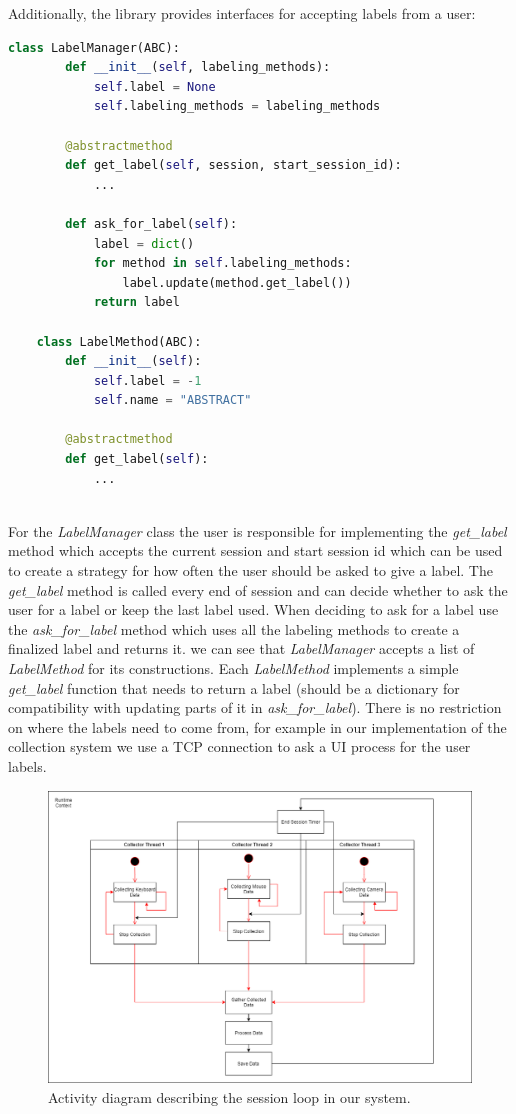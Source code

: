 \documentclass[../main.tex]{subfiles}
\begin{document}
Additionally, the library provides interfaces for accepting labels from a user: 
\begin{lstlisting}[language=Python]
    class LabelManager(ABC):
        def __init__(self, labeling_methods):
            self.label = None
            self.labeling_methods = labeling_methods
    
        @abstractmethod
        def get_label(self, session, start_session_id):
            ...
    
        def ask_for_label(self):
            label = dict()
            for method in self.labeling_methods:
                label.update(method.get_label())
            return label

    class LabelMethod(ABC):
        def __init__(self):
            self.label = -1
            self.name = "ABSTRACT"
    
        @abstractmethod
        def get_label(self):
            ...
    
\end{lstlisting}
For the \textit{LabelManager} class the user is responsible for implementing the \textit{get\_label} method which accepts the current session and start session id
which can be used to create a strategy for how often the user should be asked to give a label.
The \textit{get\_label} method is called every end of session and can decide whether to ask the user for a label or keep the last label used.
When deciding to ask for a label use the \textit{ask\_for\_label} method which uses all the labeling methods to create a finalized label and returns it.
we can see that \textit{LabelManager} accepts a list of \textit{LabelMethod} for its constructions. Each \textit{LabelMethod} implements a simple \textit{get\_label}
function that needs to return a label (should be a dictionary for compatibility with updating parts of it in \textit{ask\_for\_label}). 
There is no restriction on where the labels need to come from, for example in our implementation of the collection system we use a 
TCP connection to ask a UI process for the user labels. 

\begin{figure}[htp]
    \centering
    \includegraphics[width=14cm]{figures/sys_activity}   
    \caption{Activity diagram describing the session loop in our system.}
    \label{fig:sys_activity} 
\end{figure}
\end{document}
